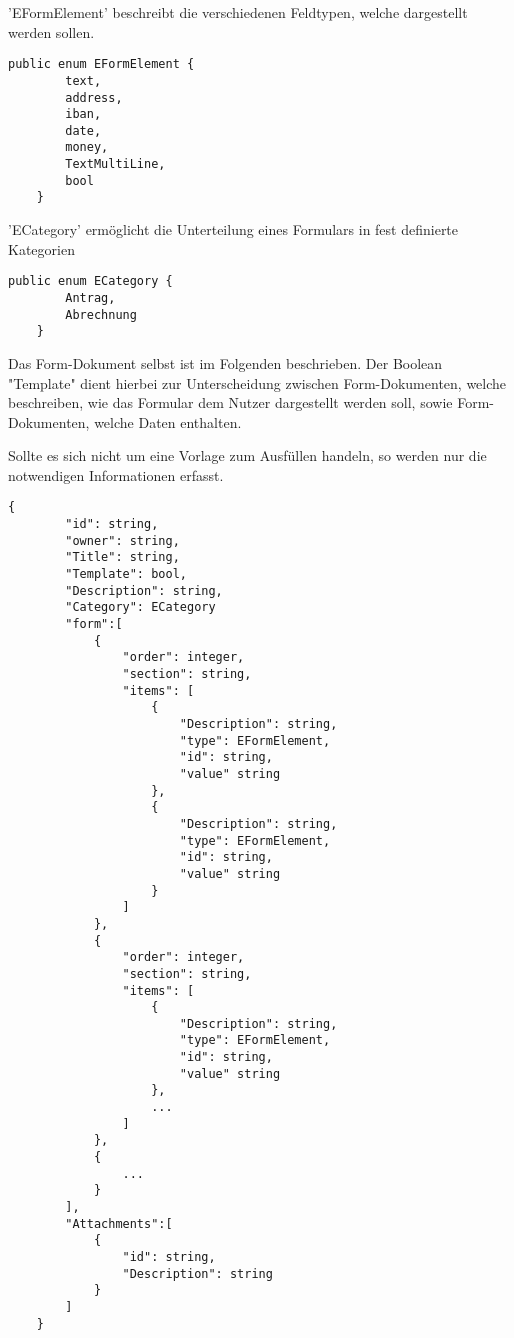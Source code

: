 'EFormElement' beschreibt die verschiedenen Feldtypen, welche dargestellt werden sollen.
\begin{lstlisting}[label={lst:EFormElement}]
    public enum EFormElement {
        text,
        address,
        iban,
        date,
        money,
        TextMultiLine,
        bool
    }
\end{lstlisting}


'ECategory' ermöglicht die Unterteilung eines Formulars in fest definierte Kategorien
\begin{lstlisting}[label={lst:ECategory}]
    public enum ECategory {
        Antrag,
        Abrechnung
    }
\end{lstlisting}

Das Form-Dokument selbst ist im Folgenden beschrieben.
Der Boolean "Template" dient hierbei zur Unterscheidung zwischen
Form-Dokumenten, welche beschreiben, wie das Formular dem Nutzer
dargestellt werden soll, sowie Form-Dokumenten, welche Daten enthalten.

Sollte es sich nicht um eine Vorlage zum Ausfüllen handeln, so werden nur die notwendigen Informationen erfasst.
\begin{lstlisting}[label={lst:lstlistingdoc}]
    {
        "id": string,
        "owner": string,
        "Title": string,
        "Template": bool,
        "Description": string,
        "Category": ECategory
        "form":[
            {
                "order": integer,
                "section": string,
                "items": [
                    {
                        "Description": string,
                        "type": EFormElement,
                        "id": string,
                        "value" string
                    },
                    {
                        "Description": string,
                        "type": EFormElement,
                        "id": string,
                        "value" string
                    }
                ]
            },
            {
                "order": integer,
                "section": string,
                "items": [
                    {
                        "Description": string,
                        "type": EFormElement,
                        "id": string,
                        "value" string
                    },
                    ...
                ]
            },
            {
                ...
            }
        ],
        "Attachments":[
            {
                "id": string,
                "Description": string
            }
        ]
    }
\end{lstlisting}